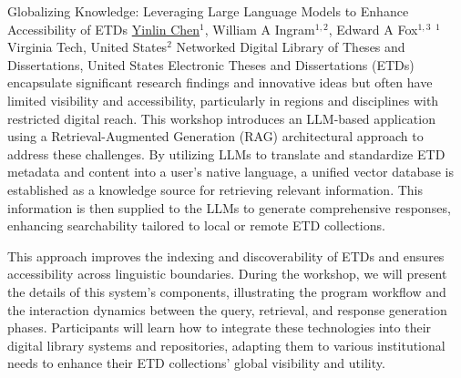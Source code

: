 
    \begin{abstract_online}{Globalizing Knowledge: Leveraging Large Language Models to Enhance Accessibility of ETDs}{%
        \underline{Yinlin Chen}$^{1}$, William A Ingram$^{1,2}$, Edward A Fox$^{1,3}$}{%
        }{%
        $^1$ Virginia Tech, United States\newline{}$^2$ Networked Digital Library of Theses and Dissertations, United States}
        Electronic Theses and Dissertations (ETDs) encapsulate significant research findings and innovative ideas but often have limited visibility and accessibility, particularly in regions and disciplines with restricted digital reach. This workshop introduces an LLM-based application using a Retrieval-Augmented Generation (RAG) architectural approach to address these challenges. By utilizing LLMs to translate and standardize ETD metadata and content into a user’s native language, a unified vector database is established as a knowledge source for retrieving relevant information. This information is then supplied to the LLMs to generate comprehensive responses, enhancing searchability tailored to local or remote ETD collections.

        This approach improves the indexing and discoverability of ETDs and ensures accessibility across linguistic boundaries. During the workshop, we will present the details of this system's components, illustrating the program workflow and the interaction dynamics between the query, retrieval, and response generation phases. Participants will learn how to integrate these technologies into their digital library systems and repositories, adapting them to various institutional needs to enhance their ETD collections' global visibility and utility.
    
    \end{abstract_online}
    
